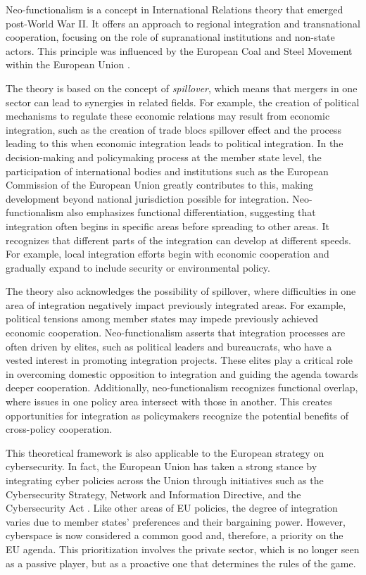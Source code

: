Neo-functionalism is a concept in International Relations theory that emerged post-World War II. It offers an approach to regional integration and transnational cooperation, focusing on the role of supranational institutions and non-state actors. This principle was influenced by the European Coal and Steel Movement within the European Union \autocite{dunn_2013_neofunctionalism}.

The theory is based on the concept of \textit{spillover}, which means that mergers in one sector can lead to synergies in related fields. For example, the creation of political mechanisms to regulate these economic relations may result from economic integration, such as the creation of trade blocs spillover effect and the process leading to this when economic integration leads to political integration. In the decision-making and policymaking process at the member state level, the participation of international bodies and institutions such as the European Commission of the European Union greatly contributes to this, making development beyond national jurisdiction possible for integration. Neo-functionalism also emphasizes functional differentiation, suggesting that integration often begins in specific areas before spreading to other areas. It recognizes that different parts of the integration can develop at different speeds. For example, local integration efforts begin with economic cooperation and gradually expand to include security or environmental policy.

The theory also acknowledges the possibility of spillover, where difficulties in one area of integration negatively impact previously integrated areas. For example, political tensions among member states may impede previously achieved economic cooperation. Neo-functionalism asserts that integration processes are often driven by elites, such as political leaders and bureaucrats, who have a vested interest in promoting integration projects. These elites play a critical role in overcoming domestic opposition to integration and guiding the agenda towards deeper cooperation. Additionally, neo-functionalism recognizes functional overlap, where issues in one policy area intersect with those in another. This creates opportunities for integration as policymakers recognize the potential benefits of cross-policy cooperation.

This theoretical framework is also applicable to the European strategy on cybersecurity. In fact, the European Union has taken a strong stance by integrating cyber policies across the Union through initiatives such as the Cybersecurity Strategy, Network and Information Directive, and the Cybersecurity Act \autocite{kasper_2020_towards}. Like other areas of EU policies, the degree of integration varies due to member states' preferences and their bargaining power. However, cyberspace is now considered a common good and, therefore, a priority on the EU agenda. This prioritization involves the private sector, which is no longer seen as a passive player, but as a proactive one that determines the rules of the game.


